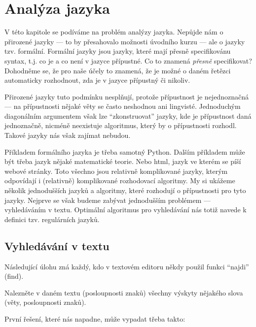 \ifx\ucebnice\undefined

\setcounter{section}{3}
\fi
\section{Analýza jazyka}
V této kapitole se podíváme na problém analýzy jazyka.  Nepůjde nám o přirozené jazyky ---
to by přesahovalo možnosti úvodního kurzu --- ale o jazyky tzv. formální. Formální jazyky
jsou jazyky, které mají přesně specifikovánu syntax, t.j. co je a co není v jazyce přípustné. 
Co to znamená \emph{přesně} specifikovat? Dohodněme se, že pro naše účely to znamená,
že je možné o daném řetězci automaticky rozhodnout, zda je v jazyce přípustný či nikoliv.

\begin{doplneni}
Přirozené jazyky tuto podmínku nesplňují, protože přípustnost je nejednoznačná ---
na přípustnosti nějaké věty se často neshodnou ani lingvisté. Jednoduchým diagonálním 
argumentem však lze ``zkonstruovat'' jazyky, kde je přípustnost daná jednoznačně, nicméně
neexistuje algoritmus, který by o přípustnosti rozhodl.  Takové jazyky nás však zajímat nebudou.
\end{doplneni}

Příkladem formálního jazyka je třeba samotný Python. Dalším příkladem může být třeba
jazyk nějaké matematické teorie.  Nebo html, jazyk ve kterém se píší webové stránky. Toto
všechno jsou relativně komplikované jazyky, kterým odpovídají i (relativně) komplikované
rozhodovací algoritmy.  My si ukážeme několik jednodušších jazyků a algoritmy, které rozhodují o 
přípustnosti pro tyto jazyky. Nejprve se však budeme zabývat jednodušším problémem ---
vyhledáváním v textu.  Optimální algoritmus pro vyhledávání nás totiž navede k definici
tzv. regulárních jazyků.

\subsection*{Vyhledávání v textu}

Následující úlohu zná každý, kdo v textovém editoru někdy použil funkci ``najdi'' (find).

\begin{uloha}\label{uloha:substring}
Nalezněte v daném textu (posloupnosti znaků) všechny výskyty nějakého slova 
(věty, posloupnosti znaků).
\end{uloha}

První řešení, které nás napadne, může vypadat třeba takto:


